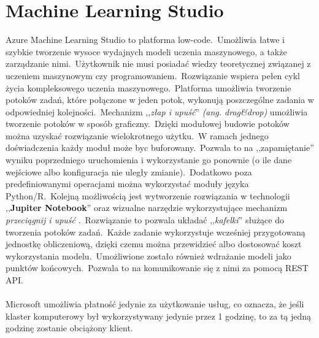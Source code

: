 \section{Machine Learning Studio}
Azure Machine Learning Studio to platforma low-code.\ Umożliwia łatwe i szybkie tworzenie wysoce wydajnych modeli uczenia maszynowego, a także zarządzanie nimi.\ Użytkownik nie musi posiadać wiedzy teoretycznej związanej z uczeniem maszynowym czy programowaniem.\ Rozwiązanie wspiera pełen cykl życia kompleksowego uczenia maszynowego.\ Platforma umożliwia tworzenie potoków zadań, które połączone w jeden potok, wykonują poszczególne zadania w odpowiedniej kolejności.\ Mechanizm ,,\textit{złap i upuść}'' \textit{(ang. drag\&drop)} umożliwia tworzenie potoków w sposób graficzny.\ Dzięki modułowej budowie potoków można uzyskać rozwiązanie wielokrotnego użytku.\ W ramach jednego doświadczenia każdy moduł może byc buforowany.\ Pozwala to na ,,zapamiętanie'' wyniku poprzedniego uruchomienia i wykorzystanie go ponownie (o ile dane wejściowe albo konfiguracja nie uległy zmianie).\ Dodatkowo poza predefiniowanymi operacjami można wykorzystać moduły języka Python/R.\ Kolejną możliwością jest wytworzenie rozwiązania w technologii ,,\textbf{Jupiter Notebook}'' oraz wizualne narzędzie wykorzystujące mechanizm \textit{przeciągnij i upuść} .\ Rozwiązanie to pozwala układać ,,\textit{kafelki}'' służące do tworzenia potoków zadań.\ Każde zadanie wykorzystuje wcześniej przygotowaną jednostkę obliczeniową, dzięki czemu można przewidzieć albo dostosować koszt wykorzystania modelu.\ Umożliwione zostało również wdrażanie modeli jako punktów końcowych.\ Pozwala to na komunikowanie się z nimi za pomocą REST API.
\\ \\
Microsoft umożliwia płatność jedynie za użytkowanie usług, co oznacza, że jeśli klaster komputerowy był wykorzystywany jedynie przez 1 godzinę, to za tą jedną godzinę zostanie obciążony klient\cite{MicrosoftAzuref}.